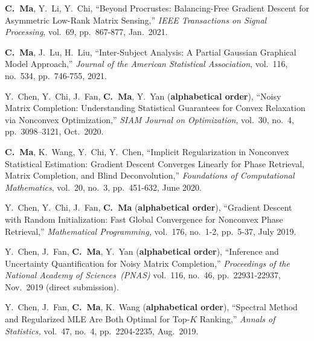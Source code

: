 \documentclass[a4paper, 10pt]{article}
\newenvironment{changemargin}[2]{%
  \begin{list}{}{%
    \setlength{\topsep}{0pt}%
    \setlength{\leftmargin}{#1}%
    \setlength{\rightmargin}{#2}%
    \setlength{\listparindent}{\parindent}%
    \setlength{\itemindent}{\parindent}%
    \setlength{\parsep}{\parskip}%
  }%
  \item[]}{\end{list}
}
\newenvironment{body} {
	\vspace*{-16pt}
	\begin{changemargin}{-0.3in}{-0.5in}
  }	
	{\end{changemargin}
}
\begin{document}
\begin{body}
\begin{enumerate}[label={[{J}{{\arabic*}}]}]
\item \textbf{C.~Ma}, Y.~Li, Y.~Chi, {``Beyond Procrustes: Balancing-Free Gradient Descent for Asymmetric Low-Rank Matrix Sensing,''} \emph{IEEE Transactions on Signal Processing}, vol.~69, pp.~867-877, Jan.~2021.


	
\item	\textbf{C.~Ma}, J.~Lu, H.~Liu, {{``Inter-Subject Analysis: A Partial Gaussian Graphical Model Approach,''}}  \emph{Journal of the American Statistical Association}, vol.~116, no.~534, pp.~746-755, 2021. \\

\item Y.~Chen, Y.~Chi, J.~Fan, \textbf{C.~Ma}, Y.~Yan (\textbf{alphabetical order}), {``Noisy Matrix Completion: Understanding Statistical Guarantees for Convex Relaxation via Nonconvex Optimization,''} \emph{SIAM Journal on Optimization}, vol.~30, no.~4, pp.~3098–3121, Oct.~2020. \\

\item \textbf{C.~Ma}, K.~Wang, Y.~Chi, Y.~Chen, {{``Implicit Regularization in Nonconvex Statistical Estimation: Gradient Descent Converges Linearly for Phase Retrieval, Matrix Completion, and Blind Deconvolution,''}}  \emph{Foundations of Computational Mathematics}, vol.~20, no.~3, pp.~451-632, June
2020. \\


\item Y.~Chen, Y.~Chi, J.~Fan, \textbf{C.~Ma} (\textbf{alphabetical order}), {``Gradient Descent with Random Initialization: Fast Global Convergence for Nonconvex Phase Retrieval,''} \emph{Mathematical Programming,} vol.~176, no.~1-2, pp.~5-37, July 2019. \\


\item Y.~Chen, J.~Fan, \textbf{C.~Ma}, Y.~Yan (\textbf{alphabetical order}), {``Inference and Uncertainty Quantification for Noisy Matrix Completion,''} \emph{Proceedings of the National Academy of Sciences~(PNAS)} vol.~116, no.~46, pp.~22931-22937, Nov.~2019 (direct submission). \\




	
\item 
	Y.~Chen, J.~Fan, \textbf{C.~Ma}, K.~Wang (\textbf{alphabetical order}), {{``Spectral Method and Regularized MLE Are Both Optimal for Top-$K$ Ranking,''}} \emph{Annals of Statistics,} vol.~47, no.~4, pp.~2204-2235, Aug.~2019. \\








\end{enumerate}
\end{body}
\end{document}
